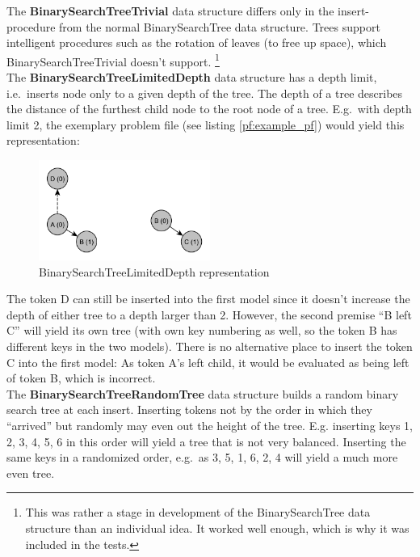 \documentclass[hidelinks]{scrartcl}
\begin{document}
The \textbf{BinarySearchTreeTrivial} data structure differs only in the insert-procedure from the normal BinarySearchTree data structure. Trees support intelligent procedures such as the rotation of leaves (to free up space), which BinarySearchTreeTrivial doesn't support. \footnote{This was rather a stage in development of the BinarySearchTree data structure than an individual idea. It worked well enough, which is why it was included in the tests.} \\

The \textbf{BinarySearchTreeLimitedDepth} data structure has a depth limit, i.e.\ inserts node only to a given depth of the tree. The depth of a tree describes the distance of the furthest child node to the root node of a tree. E.g.\ with depth limit 2, the exemplary problem file (see listing \ref{pf:example_pf}) would yield this representation:

\begin{figure}[H]
	\caption{BinarySearchTreeLimitedDepth representation}
	\label{img:binarysearchtreelimiteddepth_example_pf}
	\centering
	\includegraphics[width=0.5\textwidth]{Illustrations/BinarySearchTreeLimitedDepth.pdf}
\end{figure}

The \gls{token} D can still be inserted into the first model since it doesn't increase the depth of either tree to a depth larger than 2. However, the second \gls{premise} ``B left C'' will yield its own tree (with own key numbering as well, so the \gls{token} B has different keys in the two models). There is no alternative place to insert the \gls{token} C into the first model: As \gls{token} A's left child, it would be evaluated as being left of \gls{token} B, which is incorrect. \\

The \textbf{BinarySearchTreeRandomTree} data structure builds a random binary search tree at each insert. Inserting \gls{token}s not by the order in which they ``arrived'' but randomly may even out the height of the tree. E.g. inserting keys 1, 2, 3, 4, 5, 6 in this order will yield a tree that is not very balanced. Inserting the same keys in a randomized order, e.g.\ as 3, 5, 1, 6, 2, 4 will yield a much more even tree.
\end{document}
